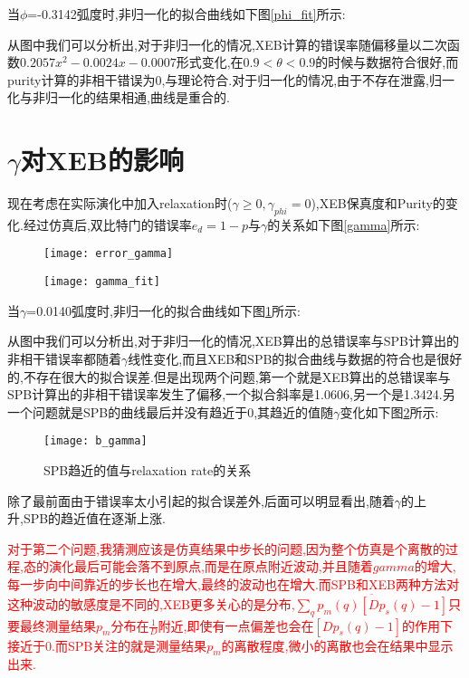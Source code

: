 当$\phi$=-0.3142弧度时,非归一化的拟合曲线如下图\ref{phi_fit}所示:

从图中我们可以分析出,对于非归一化的情况,XEB计算的错误率随偏移量以二次函数$0.2057x^{2}-0.0024x-0.0007$形式变化,在$0.9<\theta<0.9$的时候与数据符合很好,而purity计算的非相干错误为0,与理论符合.对于归一化的情况,由于不存在泄露,归一化与非归一化的结果相通,曲线是重合的.

\section{$\gamma$对XEB的影响}

现在考虑在实际演化中加入relaxation时($\gamma \geq 0 ,\gamma_{phi}=0 $),XEB保真度和Purity的变化.经过仿真后,双比特门的错误率$e_{d} = 1-p$与$\gamma$的关系如下图\ref{gamma}所示:
\begin{figure}[ht]
	\centering
	\begin{minipage}{0.48\linewidth}
		\texttt{[image: error\_gamma]}
		\label{gamma}
	\end{minipage}
	\begin{minipage}{0.48\linewidth}
		\texttt{[image: gamma\_fit]}
		\label{gamma_fit}
	\end{minipage}
	
	\caption{} 
\end{figure}

当$\gamma$=0.0140弧度时,非归一化的拟合曲线如下图\ref{gamma_fit}所示:

从图中我们可以分析出,对于非归一化的情况,XEB算出的总错误率与SPB计算出的非相干错误率都随着$\gamma$线性变化,而且XEB和SPB的拟合曲线与数据的符合也是很好的,不存在很大的拟合误差.但是出现两个问题,第一个就是XEB算出的总错误率与SPB计算出的非相干错误率发生了偏移,一个拟合斜率是1.0606,另一个是1.3424.另一个问题就是SPB的曲线最后并没有趋近于0,其趋近的值随$\gamma$变化如下图\ref{b_gamma}所示:
\begin{figure}
	\centering
	\texttt{[image: b\_gamma]}
	\caption{SPB趋近的值与relaxation rate的关系} 
	\label{b_gamma}
\end{figure}
除了最前面由于错误率太小引起的拟合误差外,后面可以明显看出,随着$\gamma$的上升,SPB的趋近值在逐渐上涨.

\textcolor{red}{对于第二个问题,我猜测应该是仿真结果中步长的问题,因为整个仿真是个离散的过程,态的演化最后可能会落不到原点,而是在原点附近波动,并且随着$gamma$的增大,每一步向中间靠近的步长也在增大,最终的波动也在增大.而SPB和XEB两种方法对这种波动的敏感度是不同的,XEB更多关心的是分布,$\overline{\sum_{q}p_{m}(q)[Dp_{s}(q)-1]}$只要最终测量结果$p_{m}$分布在$\frac{1}{D}$附近,即使有一点偏差也会在$[Dp_{s}(q)-1]$的作用下接近于0.而SPB关注的就是测量结果$p_{m}$的离散程度,微小的离散也会在结果中显示出来.}

